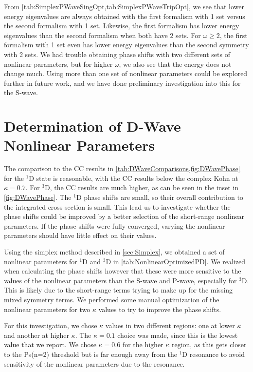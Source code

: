 \documentclass[Dissertation.tex]{subfiles}
\begin{document}
From \cref{tab:SimplexPWaveSingOpt,tab:SimplexPWaveTripOpt}, we see that lower energy eigenvalues are always obtained with the first formalism with 1 set versus the second formalism with 1 set. Likewise, the first formalism has lower energy eigenvalues than the second formalism when both have 2 sets. For $\omega \geq 2$, the first formalism with 1 set even has lower energy eigenvalues than the second symmetry with 2 sets. We had trouble obtaining phase shifts with two different sets of nonlinear parameters, but for higher $\omega$, we also see that the energy does not change much. Using more than one set of nonlinear parameters could be explored further in future work, and we have done preliminary investigation into this for the S-wave.


\section{Determination of D-Wave Nonlinear Parameters}
\label{sec:DWaveNonlinear}

The comparison to the CC results \cite{Walters2004,Blackwood2002}
in \cref{tab:DWaveComparisons,fig:DWavePhase} for the $^1$D state is
reasonable, with the CC results below the complex Kohn at $\kappa = 0.7$.
For $^3$D, the CC results are much higher, as can be seen in the inset
in \cref{fig:DWavePhase}. The $^1$D phase shifts are small, so their overall
contribution to the integrated cross section is small. 
This lead us to investigate whether the phase shifts could be improved by a
better selection of the short-range nonlinear parameters. If the phase shifts
were fully converged, varying the nonlinear parameters should have little
effect on their values.

Using the simplex method described in \cref{sec:Simplex}, we obtained a set of
nonlinear parameters for $^1$D and $^3$D in \cref{tab:NonlinearOptimizedPD}.
We realized when calculating the phase shifts however that these were more
sensitive to the values of the nonlinear parameters than the S-wave and P-wave,
especially for $^3$D. This is likely due to the short-range terms trying to
make up for the missing mixed symmetry terms. We performed some manual
optimization of the nonlinear parameters for two $\kappa$ values to try to
improve the phase shifts.

For this investigation, we chose $\kappa$ values in two different regions:
one at lower $\kappa$ and another at higher $\kappa$. The $\kappa = 0.1$ choice
was made, since this is the lowest value that we report. We chose $\kappa = 0.6$
for the higher $\kappa$ region, as this gets closer to the Ps(n=2) threshold
but is far enough away from the $^1$D resonance to avoid sensitivity of the
nonlinear parameters due to the resonance.
\end{document}
